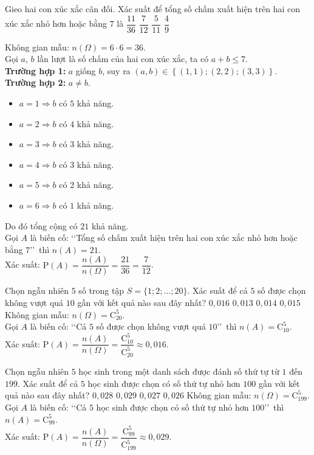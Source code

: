 \begin{ex}%
	Gieo hai con xúc xắc cân đối. Xác suất để tổng số chấm xuất hiện trên hai con xúc xắc nhỏ hơn hoặc bằng $7$ là
	\choice
	{$\dfrac{11}{36}$}
	{\True $\dfrac{7}{12}$}
	{$\dfrac{5}{11}$}
	{$\dfrac{4}{9}$}
	\loigiai
	{
		Không gian mẫu: $n(\Omega)=6\cdot 6=36$.\\
		Gọi $a$, $b$ lần lượt là số chấm của hai con xúc xắc, ta có $a+b\le 7$.\\
		\textbf{Trường hợp 1:} $a$ giống $b$, suy ra $(a,b)\in \left\{(1,1);(2,2);(3,3)\right\}$.\\
		\textbf{Trường hợp 2:} $a\ne b$.
		\begin{itemize}
			\item $a=1\Rightarrow b$ có $5$ khả năng.
			\item $a=2\Rightarrow b$ có $4$ khả năng.
			\item $a=3\Rightarrow b$ có $3$ khả năng.
			\item $a=4\Rightarrow b$ có $3$ khả năng.
			\item $a=5\Rightarrow b$ có $2$ khả năng.
			\item $a=6\Rightarrow b$ có $1$ khả năng.			
		\end{itemize}
		Do đó tổng cộng có $21$ khả năng.\\
		Gọi $A$ là biến cố: \lq\lq Tổng số chấm xuất hiện trên hai con xúc xắc nhỏ hơn hoặc bằng $7$\rq\rq \, thì $n(A)=21$.\\
		Xác suất: $\mathrm{P}(A)=\dfrac{n(A)}{n(\Omega)} =\dfrac{21}{36}=\dfrac{7}{12}$.			
	}	
\end{ex}
\begin{ex}%
	Chọn ngẫu nhiên $5$ số trong tập $S=\{1 ; 2 ; \ldots ; 20\}$. Xác suất để cả $5$ số được chọn không vượt quá $10$ gần với kết quả nào sau đây nhất? 
	\choice
	{\True $0{,}016$}
	{$0{,}013$}
	{$0{,}014$}
	{$0{,}015$}
	\loigiai
	{
		Không gian mẫu: $n(\Omega)=\mathrm{C}^5_{20}$.\\
		Gọi $A$ là biến cố: \lq\lq Cả $5$ số được chọn không vượt quá $10$\rq\rq \, thì $n(A)=\mathrm{C}^5_{10}$.\\
		Xác suất: $\mathrm{P}(A)=\dfrac{n(A)}{n(\Omega)} =\dfrac{\mathrm{C}^5_{10}}{\mathrm{C}^5_{20}}\approx 0{,}016$.			
	}	
\end{ex}
\begin{ex}%
	Chọn ngẫu nhiên $5$ học sinh trong một danh sách được đánh số thứ tự từ $1$ đến $199$. Xác suất để cả $5$ học sinh được chọn có số thứ tự nhỏ hơn $100$ gần với kết quả nào sau đây nhất?
	\choice
	{$0{,}028$}
	{\True $0{,}029$}
	{$0{,}027$}
	{$0{,}026$}
	\loigiai
	{
		Không gian mẫu: $n(\Omega)=\mathrm{C}^5_{199}$.\\
		Gọi $A$ là biến cố: \lq\lq Cả $5$ học sinh được chọn có số thứ tự nhỏ hơn $100$\rq\rq \, thì $n(A)=\mathrm{C}^5_{99}$.\\
		Xác suất: $\mathrm{P}(A)=\dfrac{n(A)}{n(\Omega)} =\dfrac{\mathrm{C}^5_{99}}{\mathrm{C}^5_{199}}\approx 0{,}029$.		
	}	
\end{ex}
